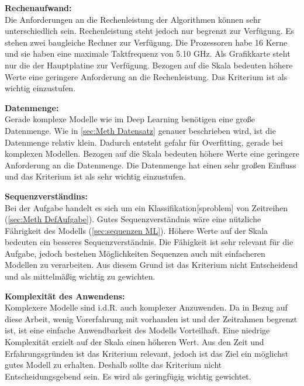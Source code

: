 \textbf{Rechenaufwand:}\\
Die Anforderungen an die Rechenleistung der Algorithmen können sehr unterschiedlich sein. Rechenleistung 
steht jedoch nur begrenzt zur Verfügung. Es stehen zwei baugleiche Rechner zur Verfügung. Die Prozessoren 
habe 16 Kerne und sie haben eine maximale Taktfrequenz von 5.10 GHz. Als Grafikkarte steht nur die der 
Hauptplatine zur Verfügung. Bezogen auf die Skala bedeuten höhere Werte eine geringere Anforderung an die Rechenleistung. Das Kriterium ist als wichtig einzustufen.\par

\textbf{Datenmenge:}\\
Gerade komplexe Modelle wie im \gls{Deep Learning} benötigen eine große Datenmenge. Wie in \ref{sec:Meth Datensatz} genauer beschrieben wird, ist die Datenmenge relativ klein. Dadurch entsteht gefahr für \gls{Overfitting}, gerade bei komplexen Modellen. Bezogen auf die Skala bedeuten höhere Werte eine geringere Anforderung an die Datenmenge. Die Datenmenge hat einen sehr großen Einfluss und das Kriterium ist als sehr wichtig einzustufen. \par

\textbf{Sequenzverständins:}\\
Bei der Aufgabe handelt es sich um ein \gls{Klassifikation}[sproblem] von Zeitreihen (\ref{sec:Meth DefAufgabe}). Gutes Sequenzverständnis wäre eine nützliche Fährigkeit des Modells (\ref{sec:sequenzen ML}). Höhere Werte auf der Skala bedeuten ein besseres Sequenzverständnis. Die Fähigkeit ist sehr relevant für die Aufgabe, jedoch bestehen Möglichkeiten Sequenzen auch mit einfacheren Modellen zu verarbeiten. Aus diesem Grund ist das Kriterium nicht Entscheidend und als mittelmäßig wichtig zu gewichten. \par

\textbf{Komplexität des Anwendens:}\\
Komplexere Modelle sind i.d.R. auch komplexer Anzuwenden. Da in Bezug auf diese Arbeit, wenig Vorerfahrung mit  vorhanden ist und der Zeitrahmen begrenzt ist, ist eine einfache Anwendbarkeit des Modells Vorteilhaft. Eine niedrige Komplexität erzielt auf der Skala einen höheren Wert. Aus den Zeit und Erfahrungsgründen ist das Kriterium relevant, jedoch ist das Ziel ein möglichst gutes Modell zu erhalten. Deshalb sollte das Kriterium nicht Entscheidungsgebend sein. Es wird als geringfügig wichtig gewichtet. \par

